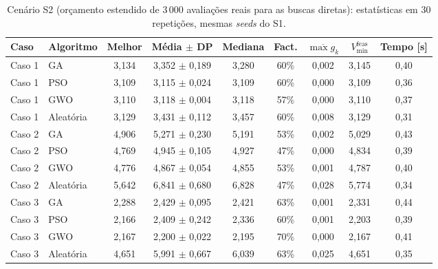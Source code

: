 \begin{table}[!t]
    \centering
    \caption{Cenário S2 (orçamento estendido de 3\,000 avaliações reais para as buscas diretas): estatísticas em 30 repetições, mesmas \textit{seeds} do S1.}
    \label{tab:s2}
    \small
    \begin{tabular}{llccccccc}
        \toprule
        Caso & Algoritmo & Melhor & Média $\pm$ DP & Mediana & Fact. & $\overline{\max g_k}$ & $V^{\mathrm{feas}}_{\min}$ & Tempo [s] \\
        \midrule
        Caso 1 & GA & 3,134 & 3,352 $\pm$ 0,189 & 3,280 & 60\% & 0,002 & 3,145 & 0,40 \\
        Caso 1 & PSO & 3,109 & 3,115 $\pm$ 0,024 & 3,109 & 60\% & 0,000 & 3,109 & 0,36 \\
        Caso 1 & GWO & 3,110 & 3,118 $\pm$ 0,004 & 3,118 & 57\% & 0,000 & 3,110 & 0,37 \\
        Caso 1 & Aleatória & 3,129 & 3,431 $\pm$ 0,112 & 3,457 & 60\% & 0,008 & 3,129 & 0,31 \\
        \midrule
        Caso 2 & GA & 4,906 & 5,271 $\pm$ 0,230 & 5,191 & 53\% & 0,002 & 5,029 & 0,43 \\
        Caso 2 & PSO & 4,769 & 4,945 $\pm$ 0,105 & 4,927 & 47\% & 0,000 & 4,834 & 0,39 \\
        Caso 2 & GWO & 4,776 & 4,867 $\pm$ 0,054 & 4,855 & 53\% & 0,001 & 4,787 & 0,40 \\
        Caso 2 & Aleatória & 5,642 & 6,841 $\pm$ 0,680 & 6,828 & 47\% & 0,028 & 5,774 & 0,34 \\
        \midrule
        Caso 3 & GA & 2,288 & 2,429 $\pm$ 0,095 & 2,421 & 63\% & 0,001 & 2,331 & 0,44 \\
        Caso 3 & PSO & 2,166 & 2,409 $\pm$ 0,242 & 2,336 & 60\% & 0,001 & 2,203 & 0,39 \\
        Caso 3 & GWO & 2,167 & 2,200 $\pm$ 0,022 & 2,195 & 70\% & 0,000 & 2,167 & 0,41 \\
        Caso 3 & Aleatória & 4,651 & 5,991 $\pm$ 0,667 & 6,039 & 63\% & 0,025 & 4,651 & 0,35 \\
        \bottomrule
    \end{tabular}
\end{table}
